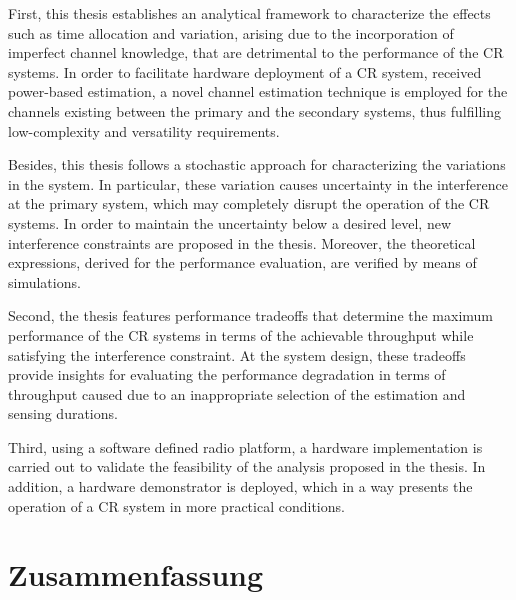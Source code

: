 First, this thesis establishes an analytical framework to characterize the effects such as time allocation and variation, arising due to the incorporation of imperfect channel knowledge, that are detrimental to the performance of the CR systems. In order to facilitate hardware deployment of a CR system, received power-based estimation, a novel channel estimation technique is employed for the channels existing between the primary and the secondary systems, thus fulfilling low-complexity and versatility requirements. 

Besides, this thesis follows a stochastic approach for characterizing the variations in the system. In particular, these variation causes uncertainty in the interference at the primary system, which may completely disrupt the operation of the CR systems. In order to maintain the uncertainty below a desired level, new interference constraints are proposed in the thesis. Moreover, the theoretical expressions, derived for the performance evaluation, are verified by means of simulations. 




Second, the thesis features performance tradeoffs that determine the maximum performance of the CR systems in terms of the achievable throughput while satisfying the interference constraint. At the system design, these tradeoffs provide insights for evaluating the performance degradation in terms of throughput caused due to an inappropriate selection of the estimation and sensing durations. 

Third, using a software defined radio platform, a hardware implementation is carried out to validate the feasibility of the analysis proposed in the thesis. In addition, a hardware demonstrator is deployed, which in a way presents the operation of a CR system in more practical conditions. %



\cleardoublepage
\chapter*{Zusammenfassung}


\cleardoublepage
